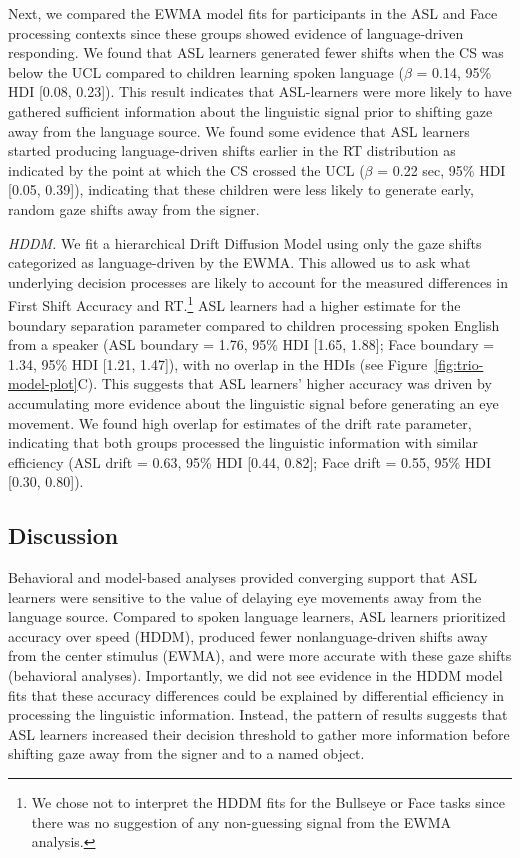 \documentclass[,man,floatsintext]{apa6}
\let\rmarkdownfootnote\footnote%
\def\footnote{\protect\rmarkdownfootnote}
\begin{document}
Next, we compared the EWMA model fits for participants in the ASL and
Face processing contexts since these groups showed evidence of
language-driven responding. We found that ASL learners generated fewer
shifts when the CS was below the UCL compared to children learning
spoken language (\(\beta\) = 0.14, 95\% HDI {[}0.08, 0.23{]}). This
result indicates that ASL-learners were more likely to have gathered
sufficient information about the linguistic signal prior to shifting
gaze away from the language source. We found some evidence that ASL
learners started producing language-driven shifts earlier in the RT
distribution as indicated by the point at which the CS crossed the UCL
(\(\beta\) = 0.22 sec, 95\% HDI {[}0.05, 0.39{]}), indicating that these
children were less likely to generate early, random gaze shifts away
from the signer.

\emph{HDDM.} We fit a hierarchical Drift Diffusion Model using only the
gaze shifts categorized as language-driven by the EWMA. This allowed us
to ask what underlying decision processes are likely to account for the
measured differences in First Shift Accuracy and RT.\footnote{We chose
  not to interpret the HDDM fits for the Bullseye or Face tasks since
  there was no suggestion of any non-guessing signal from the EWMA
  analysis.} ASL learners had a higher estimate for the boundary
separation parameter compared to children processing spoken English from
a speaker (ASL boundary = 1.76, 95\% HDI {[}1.65, 1.88{]}; Face boundary
= 1.34, 95\% HDI {[}1.21, 1.47{]}), with no overlap in the HDIs (see
Figure~\ref{fig:trio-model-plot}C). This suggests that ASL learners'
higher accuracy was driven by accumulating more evidence about the
linguistic signal before generating an eye movement. We found high
overlap for estimates of the drift rate parameter, indicating that both
groups processed the linguistic information with similar efficiency (ASL
drift = 0.63, 95\% HDI {[}0.44, 0.82{]}; Face drift = 0.55, 95\% HDI
{[}0.30, 0.80{]}).

\subsection{Discussion}\label{discussion}

Behavioral and model-based analyses provided converging support that ASL
learners were sensitive to the value of delaying eye movements away from
the language source. Compared to spoken language learners, ASL learners
prioritized accuracy over speed (HDDM), produced fewer
nonlanguage-driven shifts away from the center stimulus (EWMA), and were
more accurate with these gaze shifts (behavioral analyses). Importantly,
we did not see evidence in the HDDM model fits that these accuracy
differences could be explained by differential efficiency in processing
the linguistic information. Instead, the pattern of results suggests
that ASL learners increased their decision threshold to gather more
information before shifting gaze away from the signer and to a named
object.
\end{document}
